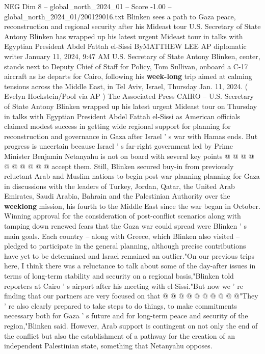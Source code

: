 \begin{textsample}{NEG Dim 8 – global\_north\_2024\_01 – Score -1.00 – global\_north\_2024\_01/200129016.txt}  \label{ex:f8_neg_215}
Blinken sees a path to Gaza peace, reconstruction and regional security after his Mideast tour U.S.
Secretary of State Antony Blinken has wrapped up his latest urgent Mideast tour in talks with Egyptian President Abdel Fattah el-Sissi ByMATTHEW LEE AP diplomatic writer January 11, 2024, 9:47 AM U.S.
Secretary of State Antony Blinken, center, stands next to Deputy Chief of Staff for Policy, Tom Sullivan, onboard a C-17 aircraft as he departs for Cairo, following his \textbf{week-long} trip aimed at calming tensions across the Middle East, in Tel Aviv, Israel, Thursday Jan. 11, 2024. ( Evelyn Hockstein/Pool via AP ) The Associated Press CAIRO -- U.S.
Secretary of State Antony Blinken wrapped up his latest urgent Mideast tour on Thursday in talks with Egyptian President Abdel Fattah el-Sissi as American officials claimed modest success in getting wide regional support for planning for reconstruction and governance in Gaza after Israel ' s war with Hamas ends.
But progress is uncertain because Israel ' s far-right government led by Prime Minister Benjamin Netanyahu is not on board with several key points @ @ @ @ @ @ @ @ @ @ accept them.
Still, Blinken secured buy-in from previously reluctant Arab and Muslim nations to begin post-war planning planning for Gaza in discussions with the leaders of Turkey, Jordan, Qatar, the United Arab Emirates, Saudi Arabia, Bahrain and the Palestinian Authority over the \textbf{weeklong} mission, his fourth to the Middle East since the war began in October.
Winning approval for the consideration of post-conflict scenarios along with tamping down renewed fears that the Gaza war could spread were Blinken ' s main goals.
Each country -- along with Greece, which Blinken also visited -- pledged to participate in the general planning, although precise contributions have yet to be determined and Israel remained an outlier."On our previous trips here, I think there was a reluctance to talk about some of the day-after issues in terms of long-term stability and security on a regional basis,"Blinken told reporters at Cairo ' s airport after his meeting with el-Sissi."But now we ' re finding that our partners are very focused on that @ @ @ @ @ @ @ @ @ @"They ' re also clearly prepared to take steps to do things, to make commitments necessary both for Gaza ' s future and for long-term peace and security of the region,"Blinken said.
However, Arab support is contingent on not only the end of the conflict but also the establishment of a pathway for the creation of an independent Palestinian state, something that Netanyahu opposes.

\end{textsample}
